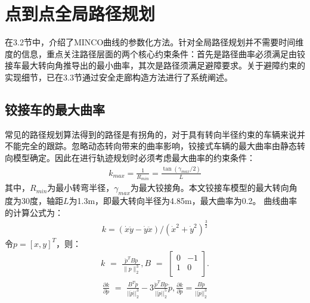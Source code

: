 \documentclass[master,academic]{ysuthesis} %
\begin{document}
	\section{点到点全局路径规划}
	在3.2节中，介绍了MINCO曲线的参数化方法。针对全局路径规划并不需要时间维度的信息，重点关注路径层面的两个核心约束条件：首先是路径曲率必须满足由铰接车最大转向角推导出的最小曲率，其次是路径须满足避障要求。关于避障约束的实现细节，已在3.3节通过安全走廊构造方法进行了系统阐述。
		\subsection{铰接车的最大曲率}
		常见的路径规划算法得到的路径是有拐角的，对于具有转向半径约束的车辆来说并不能完全的跟踪。忽略动态转向带来的曲率影响，铰接式车辆的最大曲率由静态转向模型确定。因此在进行轨迹规划时必须考虑最大曲率的约束条件：
		\begin{equation}
			\begin{aligned}
				k_{max}=\frac{1}{R_{min}}=\frac{\tan( \gamma _{max}/2 )}{L}
			\end{aligned}
		\end{equation}
		其中，$R_{min}$为最小转弯半径，$\gamma_{max}$为最大铰接角。本文铰接车模型的最大转向角度为30度，轴距$L$为1.3m，即最大转向半径为4.85m，最大曲率为0.2。
		曲线曲率的计算公式为：
		\begin{equation}
			\begin{aligned}
				k=( \dot{x}\ddot{y}-\dot{y}\ddot{x} ) /( \dot{x}^2+\dot{y}^2 ) ^{\frac{3}{2}}
			\end{aligned}
		\end{equation}
		令$p =[x,y]^T$，则：
		\begin{equation}
			\begin{aligned}
				k\,\,=\,\,\frac{\ddot{p}^TB\dot{p}}{\lVert p \rVert _{2}^{3}},B\,\,=\,\,\left[ \begin{matrix}
					0&		-1\\
					1&		0\\
				\end{matrix} \right] .
			\end{aligned}
			\label{eq:曲线曲率k}
		\end{equation}
		\begin{equation}
			\begin{aligned}
				\frac{\partial k}{\partial \dot{p}}\,\,=\,\,\frac{B^T\ddot{p}}{||\dot{p}||_{2}^{3}}-3\frac{\ddot{p}^TB\dot{p}}{||\dot{p}||_{2}^{5}}\dot{p},\frac{\partial k}{\partial \ddot{p}}=\frac{B\dot{p}}{||\dot{p}||_{2}^{3}}
			\end{aligned}
		\end{equation}
\end{document}
